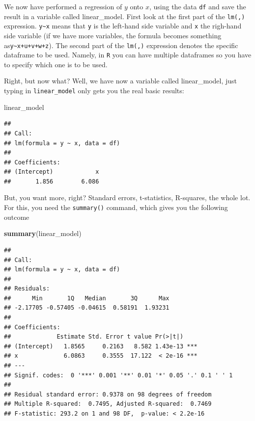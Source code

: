 \documentclass[]{article}
\newenvironment{Shaded}{\begin{snugshade}}{\end{snugshade}}
\newcommand{\KeywordTok}[1]{\textcolor[rgb]{0.13,0.29,0.53}{\textbf{{#1}}}}
\newcommand{\NormalTok}[1]{{#1}}
\theoremstyle{definition}
\theoremstyle{definition}
\theoremstyle{definition}
\theoremstyle{remark}
\begin{document}
We now have performed a regression of \(y\) onto \(x\), using the data
\texttt{df} and save the result in a variable called linear\_model.
First look at the first part of the \texttt{lm(,)} expression.
\texttt{y\textasciitilde{}x} means that \texttt{y} is the left-hand side
variable and \texttt{x} the righ-hand side variable (if we have more
variables, the formula becomes something
as\texttt{y\textasciitilde{}x+u+v+w+z}). The second part of the
\texttt{lm(,)} expression denotes the specific dataframe to be used.
Namely, in \texttt{R} you can have multiple dataframes so you have to
specify which one is to be used.

Right, but now what? Well, we have now a variable called linear\_model,
just typing in \texttt{linear\_model} only gets you the real basic
results:

\begin{Shaded}
\begin{Highlighting}[]
\NormalTok{linear_model}
\end{Highlighting}
\end{Shaded}

\begin{verbatim}
## 
## Call:
## lm(formula = y ~ x, data = df)
## 
## Coefficients:
## (Intercept)            x  
##       1.856        6.086
\end{verbatim}

But, you want more, right? Standard errors, t-statistics, R-squares, the
whole lot. For this, you need the \texttt{summary()} command, which
gives you the following outcome

\begin{Shaded}
\begin{Highlighting}[]
\KeywordTok{summary}\NormalTok{(linear_model)}
\end{Highlighting}
\end{Shaded}

\begin{verbatim}
## 
## Call:
## lm(formula = y ~ x, data = df)
## 
## Residuals:
##      Min       1Q   Median       3Q      Max 
## -2.17705 -0.57405 -0.04615  0.58191  1.93231 
## 
## Coefficients:
##             Estimate Std. Error t value Pr(>|t|)    
## (Intercept)   1.8565     0.2163   8.582 1.43e-13 ***
## x             6.0863     0.3555  17.122  < 2e-16 ***
## ---
## Signif. codes:  0 '***' 0.001 '**' 0.01 '*' 0.05 '.' 0.1 ' ' 1
## 
## Residual standard error: 0.9378 on 98 degrees of freedom
## Multiple R-squared:  0.7495, Adjusted R-squared:  0.7469 
## F-statistic: 293.2 on 1 and 98 DF,  p-value: < 2.2e-16
\end{verbatim}
\end{document}
